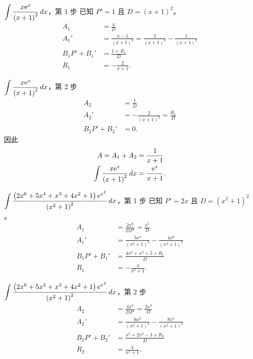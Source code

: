 \documentclass{beamer}
\newcommand{\e}{\textup e}
\theoremstyle{remark}
\begin{document}
\begin{frame}{$\displaystyle \int \frac{x \e^x}{\left( x+1 \right)^2}\,dx$，第 1 步}
  已知 $P' = 1$ 且 $D = \left( x+1 \right)^2$。
  \begin{align*}
    A_1  &= \frac x D\\
    A_1' &= \frac{x-1}{\left( x+1 \right)^3} = \frac{2}{\left( x+1 \right)^3} - \frac{1}{\left( x+1 \right)^2}\\
    B_1 P' + B_1' &= \frac{1 + R_1}{D}\\
    R_1  &= -\frac{2}{x+1}.
  \end{align*}
\end{frame}

\begin{frame}{$\displaystyle \int \frac{x \e^x}{\left( x+1 \right)^2}\,dx$，第 2 步}
  \begin{align*}
    A_2  &= \frac1D\\
    A_2' &= -\frac{2}{\left( x+1 \right)^3} = \frac{R_1}{D}\\
    B_2 P' + B_2' &= 0.
  \end{align*}
  因此
  \begin{align*}
    A = A_1 + A_2 &= \frac{1}{x+1}\\
    \int \frac{x \e^x}{\left( x+1 \right)^2}\,dx &= \frac{\e^x}{x+1}.
  \end{align*}
\end{frame}

\begin{frame}{$\displaystyle \int \frac{\left( 2x^6 + 5x^4 + x^3 + 4x^2 + 1 \right) \e^{x^2}}{\left( x^2 + 1 \right)^2}
    \,dx$，第 1 步}
  已知 $P' = 2x$ 且 $D = \left( x^2 + 1 \right)^2$。
  \begin{align*}
    A_1  &= \frac{2x^6}{DP'} = \frac{x^5}{D}\\
    A_1' &= \frac{5x^4}{\left( x^2 + 1 \right)^2} - \frac{4x^6}{\left( x^2 + 1 \right)^3}\\
    B_1 P' + B_1' &= \frac{4x^4 + x^3 + 5 + R_1}{D}\\
    R_1  &= -\frac{4}{x^2 + 1}.
  \end{align*}
\end{frame}

\begin{frame}{$\displaystyle \int \frac{\left( 2x^6 + 5x^4 + x^3 + 4x^2 + 1 \right) \e^{x^2}}{\left( x^2 + 1 \right)^2}
    \,dx$，第 2 步}
  \begin{align*}
    A_2  &= \frac{4x^4}{DP'} = \frac{2x^3}{D}\\
    A_2' &= \frac{6x^2}{\left( x^2 + 1 \right)^2} - \frac{8x^4}{\left( x^2 + 1 \right)^3}\\
    B_2 P' + B_2' &= \frac{x^3 + 2x^2 - 3 + R_2}{D}\\
    R_2  &= \frac{4}{x^2 + 1}.
  \end{align*}
\end{frame}
\end{document}
